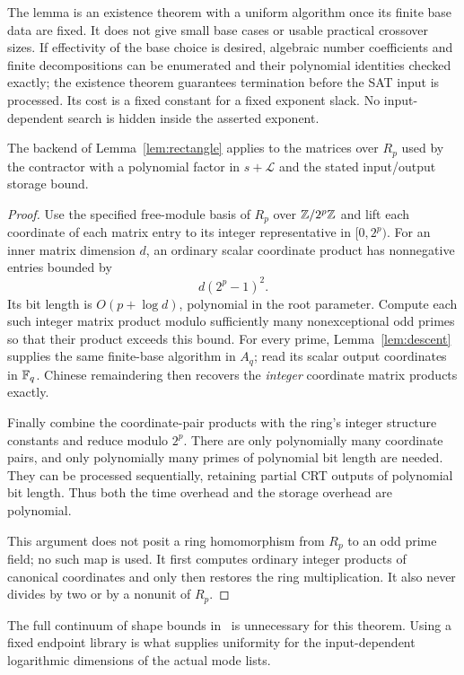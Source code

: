 The lemma is an existence theorem with a uniform algorithm once its finite
base data are fixed. It does not give small base cases or usable practical
crossover sizes. If effectivity of the base choice is desired, algebraic
number coefficients and finite decompositions can be enumerated and their
polynomial identities checked exactly; the existence theorem guarantees
termination before the SAT input is processed. Its cost is a fixed
constant for a fixed exponent slack. No input-dependent search is hidden
inside the asserted exponent.

\begin{proposition}\label{prop:ring}
The backend of Lemma~\ref{lem:rectangle} applies to the matrices over
$R_p$ used by the contractor with a polynomial factor in $s+\mathcal L$
and the stated input/output storage bound.
\end{proposition}

\begin{proof}
Use the specified free-module basis of $R_p$ over $\mathbb Z/2^p\mathbb Z$ and lift
each coordinate of each matrix entry to its integer representative in
$[0,2^p)$. For an inner matrix dimension $d$, an ordinary scalar coordinate
product has nonnegative entries bounded by
\[
 d(2^p-1)^2.
\]
Its bit length is $O(p+\log d)$, polynomial in the root parameter. Compute
each such integer matrix product modulo sufficiently many nonexceptional
odd primes so that their product exceeds this bound. For every prime,
Lemma~\ref{lem:descent} supplies the same finite-base algorithm in $A_q$;
read its scalar output coordinates in $\mathbb F_q$. Chinese remaindering then
recovers the \emph{integer} coordinate matrix products exactly.

Finally combine the coordinate-pair products with the ring's integer
structure constants and reduce modulo $2^p$. There are only polynomially
many coordinate pairs, and only polynomially many primes of polynomial
bit length are needed. They can be processed sequentially, retaining
partial CRT outputs of polynomial bit length. Thus both the time overhead
and the storage overhead are polynomial.

This argument does not posit a ring homomorphism from $R_p$ to an odd
prime field; no such map is used. It first computes ordinary integer
products of canonical coordinates and only then restores the ring
multiplication. It also never divides by two or by a nonunit of $R_p$.
\end{proof}

The full continuum of shape bounds in~\cite{uznanski} is unnecessary for
this theorem. Using a fixed endpoint library is what supplies uniformity
for the input-dependent logarithmic dimensions of the actual mode lists.
